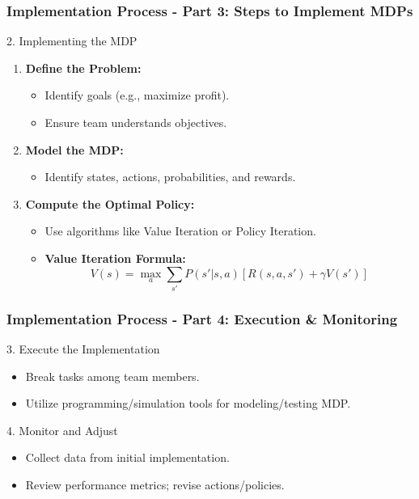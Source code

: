 \documentclass{beamer}
\begin{document}
\begin{frame}[fragile]
    \frametitle{Implementation Process - Part 3: Steps to Implement MDPs}

    \begin{block}{2. Implementing the MDP}
        \begin{enumerate}
            \item \textbf{Define the Problem:} 
                \begin{itemize}
                    \item Identify goals (e.g., maximize profit).
                    \item Ensure team understands objectives.
                \end{itemize}
            \item \textbf{Model the MDP:} 
                \begin{itemize}
                    \item Identify states, actions, probabilities, and rewards.
                \end{itemize}
            \item \textbf{Compute the Optimal Policy:}
                \begin{itemize}
                    \item Use algorithms like Value Iteration or Policy Iteration.
                    \item \textbf{Value Iteration Formula:}
                    \begin{equation}
                        V(s) = \max_{a} \sum_{s'} P(s'|s,a) \left[R(s,a,s') + \gamma V(s') \right]
                    \end{equation}
                \end{itemize}
        \end{enumerate}
    \end{block}
\end{frame}

\begin{frame}[fragile]
    \frametitle{Implementation Process - Part 4: Execution & Monitoring}

    \begin{block}{3. Execute the Implementation}
        \begin{itemize}
            \item Break tasks among team members.
            \item Utilize programming/simulation tools for modeling/testing MDP.
        \end{itemize}
    \end{block}

    \begin{block}{4. Monitor and Adjust}
        \begin{itemize}
            \item Collect data from initial implementation.
            \item Review performance metrics; revise actions/policies.
        \end{itemize}
    \end{block}
\end{frame}
\end{document}
